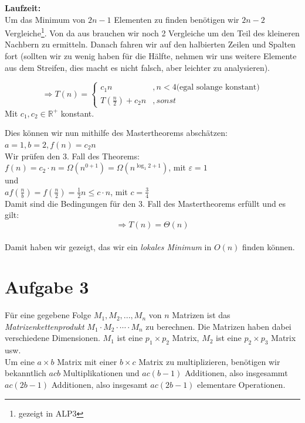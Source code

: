 \documentclass[11pt,a4paper,ngerman]{article}
\begin{document}
\begin{enumerate}[\bfseries (a)]
\textbf{Laufzeit:}\\
Um das Minimum von $2n-1$ Elementen zu finden benötigen wir $2n-2$ Vergleiche\footnote{gezeigt in ALP3}. Von da aus brauchen wir noch 2 Vergleiche um den Teil des kleineren Nachbern zu ermitteln. Danach fahren wir auf den halbierten Zeilen und Spalten fort (sollten wir zu wenig haben für die Hälfte, nehmen wir uns weitere Elemente aus dem Streifen, dies macht es nicht falsch, aber leichter zu analysieren).

$$
\Rightarrow T(n) = \left\{
\begin{array}{lr}
c_1 n &, n < 4 \text{(egal solange konstant)}\\
T(\frac{n}{2}) + c_2 n &, sonst
\end{array}
\right.
$$
Mit $c_1, c_2 \in \mathbb{R}^+$ konstant.
\end{enumerate}

Dies können wir nun mithilfe des Mastertheorems abschätzen:\\
$a=1, b=2, f(n) = c_2 n$\\
Wir prüfen den 3. Fall des Theorems:\\
$f(n) = c_2 \cdot n = \Omega (n^{0 + 1})= \Omega (n^{\log_1 2 + 1})$, mit $\varepsilon = 1$\\
und\\
$a f(\frac{n}{b}) = f(\frac{n}{2}) = \frac{1}{2}n \leq c \cdot n$, mit $c = \frac{3}{4}$\\
Damit sind die Bedingungen für den 3. Fall des Mastertheorems erfüllt und es gilt:
$$
\Rightarrow T(n) = \Theta ( n)  
$$\\

Damit haben wir gezeigt, das wir ein \emph{lokales Minimum} in $O(n)$ finden können.

\section*{Aufgabe 3}

Für eine gegebene Folge $M_1 , M_2, ... , M_n$ von $n$ Matrizen ist das \emph{Matrizenkettenprodukt} $M_1 \cdot M_2 \cdot \cdots \cdot M_n$ zu berechnen. Die Matrizen haben dabei verschiedene Dimensionen. $M_1$ ist eine $p_1 \times p_2$ Matrix, $M_2$ ist eine $p_2 \times p_3$ Matrix usw.\\

Um eine $a\times b$ Matrix mit einer $b \times c$ Matrix zu multiplizieren, benötigen wir bekanntlich $acb$ Multiplikationen und $ac\left( b - 1 \right)$ Additionen, also insgesammt $ac \left( 2b - 1\right)$ Additionen, also insgesamt $ac\left( 2b - 1\right)$ elementare Operationen.
\end{document}
